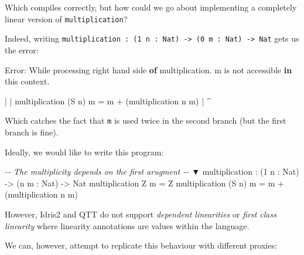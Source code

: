 \documentclass[
]{article}
\newenvironment{Shaded}{}{}
\newcommand{\CommentTok}[1]{\textcolor[rgb]{0.38,0.63,0.69}{\textit{#1}}}
\newcommand{\DataTypeTok}[1]{\textcolor[rgb]{0.56,0.13,0.00}{#1}}
\newcommand{\DecValTok}[1]{\textcolor[rgb]{0.25,0.63,0.44}{#1}}
\newcommand{\FunctionTok}[1]{\textcolor[rgb]{0.02,0.16,0.49}{#1}}
\newcommand{\KeywordTok}[1]{\textcolor[rgb]{0.00,0.44,0.13}{\textbf{#1}}}
\newcommand{\NormalTok}[1]{#1}
\newcommand{\OperatorTok}[1]{\textcolor[rgb]{0.40,0.40,0.40}{#1}}
\newcommand{\OtherTok}[1]{\textcolor[rgb]{0.00,0.44,0.13}{#1}}
\begin{document}
Which compiles correctly, but how could we go about implementing a
completely linear version of \texttt{multiplication}?

Indeed, writing
\texttt{multiplication\ :\ (1\ n\ :\ Nat)\ -\textgreater{}\ (0\ m\ :\ Nat)\ -\textgreater{}\ Nat}
gets us the error:

\begin{Shaded}
\begin{Highlighting}[]
\DataTypeTok{Error}\OperatorTok{:} \DataTypeTok{While}\NormalTok{ processing right hand side }\KeywordTok{of}\NormalTok{ multiplication}\OperatorTok{.} 
\NormalTok{    m is }\FunctionTok{not}\NormalTok{ accessible }\KeywordTok{in}\NormalTok{ this context}\OperatorTok{.}

    \OperatorTok{|}
    \OperatorTok{|}\NormalTok{ multiplication (}\DataTypeTok{S}\NormalTok{ n) m }\OtherTok{=}\NormalTok{ m }\OperatorTok{+}\NormalTok{ (multiplication n m)}
    \OperatorTok{|}                          \OperatorTok{\^{}}
\end{Highlighting}
\end{Shaded}

Which catches the fact that \texttt{m} is used twice in the second
branch (but the first branch is fine).

Ideally, we would like to write this program:

\begin{Shaded}
\begin{Highlighting}[]
\CommentTok{{-}{-}        The multiplicity depends on the first arugment}
\CommentTok{{-}{-}                               ▼}
\NormalTok{multiplication }\OperatorTok{:}\NormalTok{ (}\DecValTok{1}\NormalTok{ n }\OperatorTok{:} \DataTypeTok{Nat}\NormalTok{) }\OtherTok{{-}\textgreater{}}\NormalTok{ (n m }\OperatorTok{:} \DataTypeTok{Nat}\NormalTok{) }\OtherTok{{-}\textgreater{}} \DataTypeTok{Nat}
\NormalTok{multiplication }\DataTypeTok{Z}\NormalTok{ m }\OtherTok{=} \DataTypeTok{Z}
\NormalTok{multiplication (}\DataTypeTok{S}\NormalTok{ n) m }\OtherTok{=}\NormalTok{ m }\OperatorTok{+}\NormalTok{ (multiplication n m)}
\end{Highlighting}
\end{Shaded}

However, Idris2 and QTT do not support \emph{dependent linearities} or
\emph{first class linearity} where linearity annotations are values
within the language.

We can, however, attempt to replicate this behaviour with different
proxies:
\end{document}
